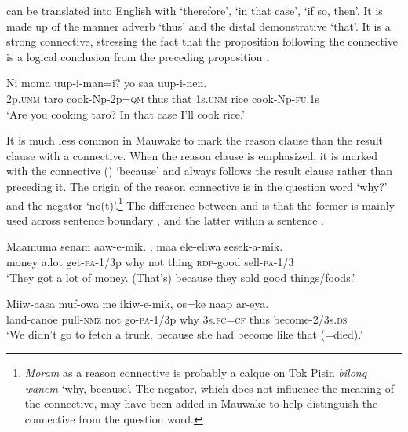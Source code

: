  can be translated into English with `therefore', `in that case', `if so, then'. It is made up of the manner adverb  `thus' and the distal demonstrative  `that'. It is a strong connective, stressing the fact that the proposition following the connective is a logical conclusion from the preceding proposition .

\ea%
\label{ex:3:x737}
\gll Ni moma uup-i-man=i?   yo saa uup-i-nen.\\
2p.\textsc{unm} taro cook-Np-2p=\textsc{qm} thus that 1s.\textsc{unm} rice cook-Np-\textsc{fu}.1s\\
\glt`Are you cooking taro? In that case I'll cook rice.'
\z

It is much less common in Mauwake to mark the reason clause than the result clause with a connective. When the reason clause is emphasized, it is marked with the connective  () `because' and always follows the result clause rather than preceding it. The origin of the reason connective is in the question word  `why?' and the negator  `no(t)'.\footnote{\textit{Moram} as a reason connective is probably a calque on Tok Pisin \textit{bilong wanem} `why, because'. The negator, which does not influence the meaning of the connective, may have been added in Mauwake to help distinguish the connective from the question word.} The difference between  and  is that the former is mainly used across sentence boundary , and the latter within a sentence .

\ea%
\label{ex:3:x738}
\gll Maamuma senam aaw-e-mik.  , maa ele-eliwa sesek-a-mik. \\
money a.lot get-\textsc{pa}-1/3p why not thing \textsc{rdp}-good sell-\textsc{pa}-1/3\\
\glt`They got a lot of money. (That's) because they sold good things/foods.'
\z

\ea%
\label{ex:3:x739}
\gll Miiw-aasa muf-owa me ikiw-e-mik,  os=ke naap ar-eya.\\
land-canoe pull-\textsc{nmz} not go-\textsc{pa}-1/3p why 3s.\textsc{fc}=\textsc{cf} thus become-2/3s.\textsc{ds}\\
\glt`We didn't go to fetch a truck, because she had become like that (=died).'
\z

